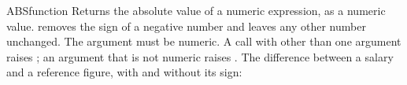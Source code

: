 \begin{XbaseEntry}{ABS}{function}
Returns the absolute value of a numeric expression, as a numeric value.
\Syntax
{}
\Usage
{} removes the sign of a negative number and leaves any other number unchanged. The argument must be numeric. A call with other than one argument raises ; an argument that is not numeric raises .
\Examples
The difference between a salary and a reference figure, with and without its sign:
\end{XbaseEntry}

